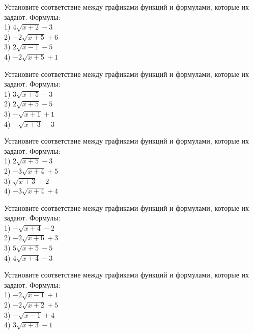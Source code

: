 \documentclass[4apaper]{article}
\begin{document}
\begin{taskBN}{71}
Установите соответствие между графиками функций и формулами, которые их задают. Формулы: \\1) $4\sqrt{x+2}-3$\\2) $-2\sqrt{x+5}+6$\\3) $2\sqrt{x-1}-5$\\4) $-2\sqrt{x+5}+1$
\end{taskBN}

\begin{taskBN}{72}
Установите соответствие между графиками функций и формулами, которые их задают. Формулы: \\1) $3\sqrt{x+5}-3$\\2) $2\sqrt{x+5}-5$\\3) $-\sqrt{x+1}+1$\\4) $-\sqrt{x+3}-3$
\end{taskBN}

\begin{taskBN}{73}
Установите соответствие между графиками функций и формулами, которые их задают. Формулы: \\1) $2\sqrt{x+5}-3$\\2) $-3\sqrt{x+4}+5$\\3) $\sqrt{x+3}+2$\\4) $-3\sqrt{x+4}+4$
\end{taskBN}

\begin{taskBN}{74}
Установите соответствие между графиками функций и формулами, которые их задают. Формулы: \\1) $-\sqrt{x+4}-2$\\2) $-2\sqrt{x+6}+3$\\3) $5\sqrt{x+5}-5$\\4) $4\sqrt{x+4}-3$
\end{taskBN}

\begin{taskBN}{75}
Установите соответствие между графиками функций и формулами, которые их задают. Формулы: \\1) $-2\sqrt{x-1}+1$\\2) $-2\sqrt{x+2}+5$\\3) $-\sqrt{x-1}+4$\\4) $3\sqrt{x+3}-1$
\end{taskBN}
\end{document}
